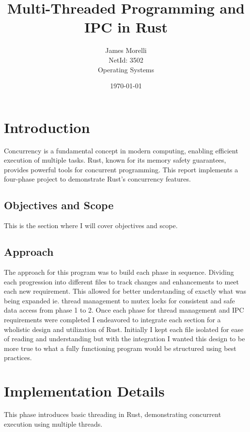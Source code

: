 \documentclass{report}
\begin{document}
\title{Multi-Threaded Programming
and IPC in Rust}
\author{James Morelli \\ \small NetId: 3502 \\ \small Operating Systems}
\date{\today}

\maketitle
\tableofcontents
\chapter{Introduction}
Concurrency is a fundamental concept in modern computing, enabling efficient execution of multiple tasks. Rust, known for its memory safety guarantees, provides powerful tools for concurrent programming. This report implements a four-phase project to demonstrate Rust's concurrency features.
\section*{Objectives and Scope}
This is the section where I will cover objectives and scope.
\section*{Approach}
The approach for this program was to build each phase in sequence. Dividing each progression into different files to track changes and enhancements to meet each new requirement. This allowed for better understanding of exactly what was being expanded ie. thread management to mutex locks for consistent and safe data access from phase 1 to 2. Once each phase for thread management and IPC requirements were completed I endeavored to integrate each section for a wholistic design and utilization of Rust. Initially I kept each file isolated for ease of reading and understanding but with the integration I wanted this design to be more true to what a fully functioning program would be structured using best practices.
\chapter{Implementation Details}
This phase introduces basic threading in Rust, demonstrating concurrent execution using multiple threads.
\end{document}

